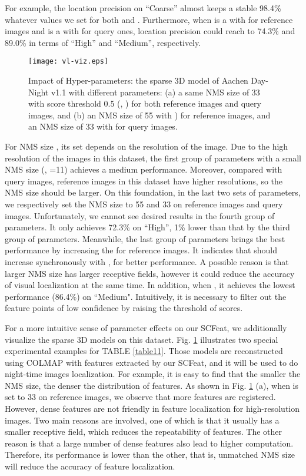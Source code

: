 \documentclass[journal]{IEEEtran}
\begin{document}
For example, the location precision on ``Coarse'' almost keeps a stable 98.4\% whatever values we set for both  and . Furthermore, when  is a  with  for reference images and  is a  with  for query ones, location precision could reach to 74.3\% and 89.0\% in terms of ``High'' and ``Medium'', respectively. 


\begin{figure}[h]
\centering
\texttt{[image: vl-viz.eps]}
\caption{
Impact of Hyper-parameters: the sparse 3D model of Aachen Day-Night v1.1 with different parameters: (a) a same NMS size of 33 with score threshold 0.5 (, ) for both reference images and query images, and (b) an NMS size of 55 with ) for reference images, and an NMS size of 33 with  for query images.
}
\label{fig9}
\end{figure}

For NMS size , its set depends on the resolution of the image. Due to the high resolution of the images in this dataset, the first group of parameters with a small NMS size (, =11) achieves a medium performance. 
Moreover, compared with query images, reference images in this dataset have higher resolutions, so the NMS size should be larger. On this foundation, in the last two sets of parameters, we respectively set the NMS size  to 55 and 33 on reference images and query images. 
Unfortunately, we cannot see desired results in the fourth group of parameters. It only achieves 72.3\% on ``High'', 1\% lower than that by the third group of parameters. 
Meanwhile, the last group of parameters brings the best performance by increasing the  for reference images. 
It indicates that  should increase synchronously with , for better performance. A possible reason is that larger NMS size has larger receptive fields, however it could reduce the accuracy of visual localization at the same time. In addition, when , it achieves the lowest performance (86.4\%) on ``Medium". Intuitively, it is necessary to filter out the feature points of low confidence by raising the threshold of scores.



For a more intuitive sense of parameter effects on our SCFeat, we additionally visualize the sparse 3D models on this dataset.
Fig. \ref{fig9} illustrates two special experimental examples for TABLE \ref{table11}. 
Those models are reconstructed using COLMAP \cite{schoenberger2016sfm,schoenberger2016mvs} with features extracted by our SCFeat, and it will be used to do night-time images localization. 
For example, it is easy to find that the smaller the NMS size, the denser the distribution of features.
As shown in Fig. \ref{fig9} (a), when  is set to 33 on reference images, we observe that more features are registered. However, dense features are not friendly in feature localization for high-resolution images. Two main reasons are involved, one of which is that it usually has a smaller receptive field, which reduces the repeatability of features. The other reason is that a large number of dense features also lead to higher computation. Therefore, its performance is lower than the other, that is, unmatched NMS size will reduce the accuracy of feature localization.
\end{document}

